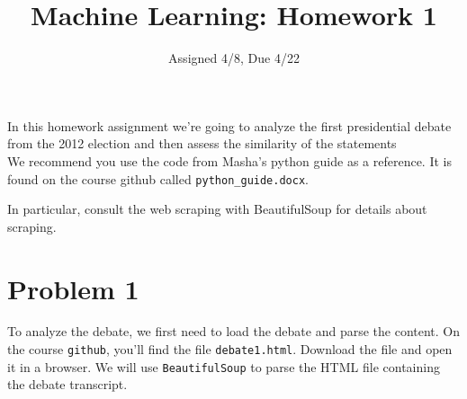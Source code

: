 \documentclass[12pt,letterpaper]{article}
\title{Machine Learning: Homework 1}
\date{Assigned 4/8, Due 4/22}
\begin{document}
\maketitle


In this homework assignment we're going to analyze the first presidential debate from the 2012 election and then assess the similarity of the statements  \\

We recommend you use the code from Masha's python guide as a reference.  It is found on 
the course github called {\tt python\_guide.docx}.  

In particular, consult the web scraping with BeautifulSoup for details about scraping. 


\section*{Problem 1}
To analyze the debate, we first need to load the debate and parse the content.  On the course {\tt github}, you'll find the file {\tt debate1.html}.  Download the file and open it in a browser. We will use {\tt BeautifulSoup} to parse the HTML file containing the debate transcript.
\end{document}
